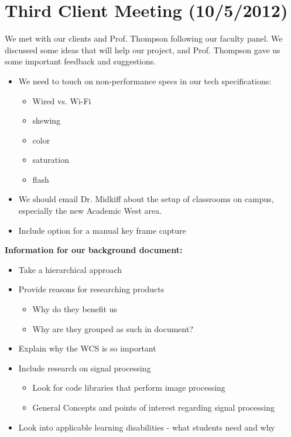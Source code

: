 \documentclass[]{article}
\begin{document}
	\section{Third Client Meeting (10/5/2012)}
	We met with our clients and Prof. Thompson following our faculty panel.  We discussed some ideas that will help our project, and Prof. Thompson gave us some important feedback and suggestions.

\begin{itemize}
\item We need to touch on non-performance specs in our tech specifications: 
	\begin{itemize} \itemsep -2pt
	\item Wired vs. Wi-Fi
	\item skewing
	\item color
	\item saturation
	\item flash
	\end{itemize}
\item We should email Dr. Midkiff about the setup of classrooms on campus, especially the new Academic West area.
\item Include option for a manual key frame capture
\end{itemize}
	
\textbf{Information for our background document: }
\begin{itemize}
\item Take a hierarchical approach 
\item Provide reasons for researching products
	\begin{itemize} \itemsep -2pt
	\item Why do they benefit us 
	\item Why are they grouped as such in document?
	\end{itemize}
\item Explain why the WCS is so important
\item Include research on signal processing
	\begin{itemize} \itemsep -2pt
	\item Look for code libraries that perform image processing
	\item General Concepts and points of interest regarding signal processing
	\end{itemize}
\item Look into applicable learning disabilities - what students need and why
\end{itemize}
\end{document}

